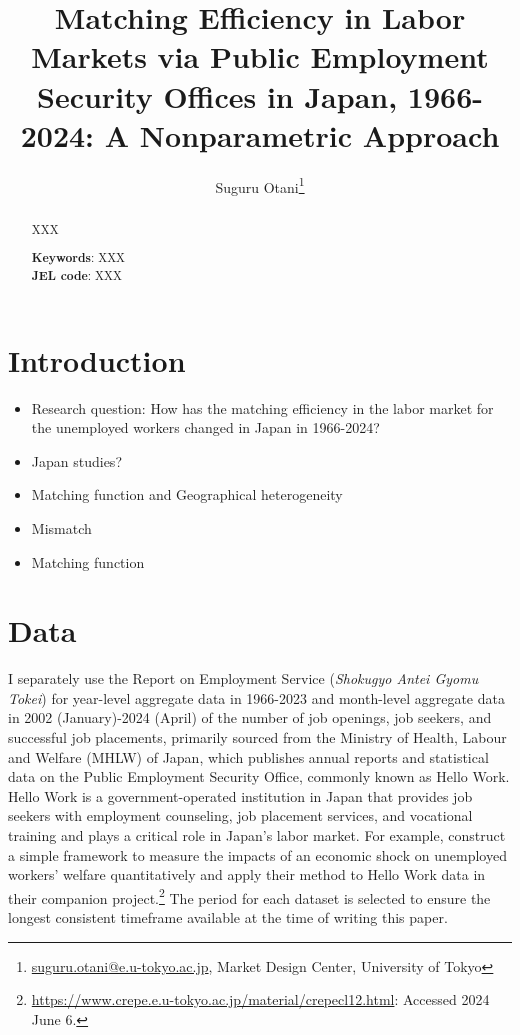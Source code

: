\documentclass[12pt]{article}
\begin{document}
\title{Matching Efficiency in Labor Markets via Public Employment Security Offices in Japan, 1966-2024: A Nonparametric Approach}
\author{Suguru Otani\thanks{\href{mailto:}{suguru.otani@e.u-tokyo.ac.jp}, Market Design Center, University of Tokyo}}
\maketitle

\begin{abstract}
\noindent
XXX

\textbf{Keywords}: XXX \\
\textbf{JEL code}: XXX
\end{abstract}

\section{Introduction}

\begin{itemize}
    \item Research question: How has the matching efficiency in the labor market for the unemployed workers changed in Japan in 1966-2024?
\end{itemize}

\begin{itemize}
    \item Japan studies? \cite{fukai2021describing}
    \item Matching function and Geographical heterogeneity \cite{higashi2018spatial,kano2005estimating}
    \item Mismatch \cite{kawata2019,csahin2014mismatch,kawata2016multi}
    \item Matching function \cite{kambayashi2006vacancy}
\end{itemize}

\section{Data}

I separately use the Report on Employment Service (\textit{Shokugyo Antei Gyomu Tokei}) for year-level aggregate data in 1966-2023 and month-level aggregate data in 2002 (January)-2024 (April) of the number of job openings, job seekers, and successful job placements, primarily sourced from the Ministry of Health, Labour and Welfare (MHLW) of Japan, which publishes annual reports and statistical data on the Public Employment Security Office, commonly known as Hello Work. 
Hello Work is a government-operated institution in Japan that provides job seekers with employment counseling, job placement services, and vocational training and plays a critical role in Japan's labor market.
For example, \cite{kawata2021first} construct a simple framework to measure the impacts of an economic shock on unemployed workers’ welfare quantitatively and apply their method to Hello Work data in their companion project.\footnote{\url{https://www.crepe.e.u-tokyo.ac.jp/material/crepecl12.html}: Accessed 2024 June 6.} 
The period for each dataset is selected to ensure the longest consistent timeframe available at the time of writing this paper.
\end{document}
